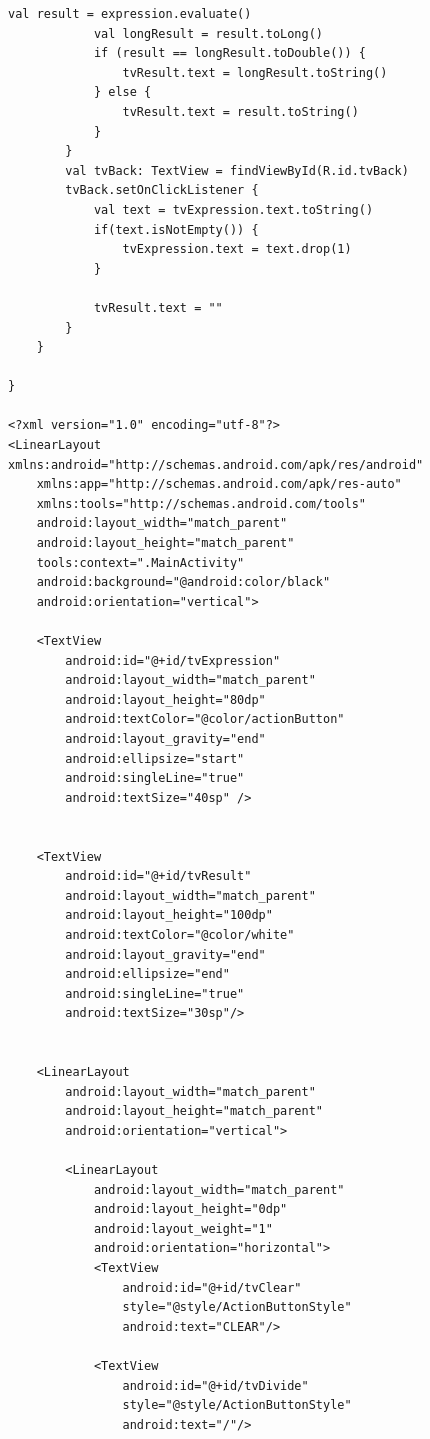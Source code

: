\documentclass[a4paper, 14pt]{extarticle}
\begin{document}
\begin{lstlisting}[language={},caption={Калькулятор на Kotlin},label={lst:code1}]
            val result = expression.evaluate()
            val longResult = result.toLong()
            if (result == longResult.toDouble()) {
                tvResult.text = longResult.toString()
            } else {
                tvResult.text = result.toString()
            }
        }
        val tvBack: TextView = findViewById(R.id.tvBack)
        tvBack.setOnClickListener {
            val text = tvExpression.text.toString()
            if(text.isNotEmpty()) {
                tvExpression.text = text.drop(1)
            }

            tvResult.text = ""
        }
    }

}

<?xml version="1.0" encoding="utf-8"?>
<LinearLayout xmlns:android="http://schemas.android.com/apk/res/android"
    xmlns:app="http://schemas.android.com/apk/res-auto"
    xmlns:tools="http://schemas.android.com/tools"
    android:layout_width="match_parent"
    android:layout_height="match_parent"
    tools:context=".MainActivity"
    android:background="@android:color/black"
    android:orientation="vertical">

    <TextView
        android:id="@+id/tvExpression"
        android:layout_width="match_parent"
        android:layout_height="80dp"
        android:textColor="@color/actionButton"
        android:layout_gravity="end"
        android:ellipsize="start"
        android:singleLine="true"
        android:textSize="40sp" />


    <TextView
        android:id="@+id/tvResult"
        android:layout_width="match_parent"
        android:layout_height="100dp"
        android:textColor="@color/white"
        android:layout_gravity="end"
        android:ellipsize="end"
        android:singleLine="true"
        android:textSize="30sp"/>


    <LinearLayout
        android:layout_width="match_parent"
        android:layout_height="match_parent"
        android:orientation="vertical">

        <LinearLayout
            android:layout_width="match_parent"
            android:layout_height="0dp"
            android:layout_weight="1"
            android:orientation="horizontal">
            <TextView
                android:id="@+id/tvClear"
                style="@style/ActionButtonStyle"
                android:text="CLEAR"/>

            <TextView
                android:id="@+id/tvDivide"
                style="@style/ActionButtonStyle"
                android:text="/"/>



\end{lstlisting}
\end{document}
